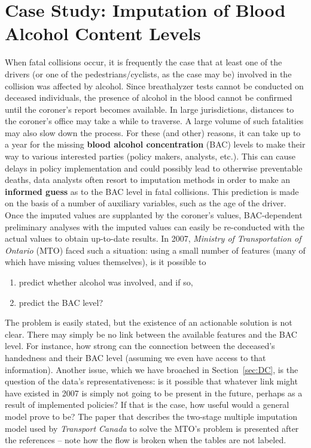 \section{Case Study: Imputation of Blood Alcohol Content Levels}
When fatal collisions occur, it is frequently the case that at least one of the drivers (or one of the pedestrians/cyclists, as the case may be) involved in the collision was affected by alcohol. Since breathalyzer tests cannot be conducted on deceased individuals, the presence of alcohol in the blood cannot be confirmed until the coroner's report becomes available. 
\newl In large jurisdictions, distances to the coroner's office may take a while to traverse. A large volume of such fatalities may also slow down the process. For these (and other) reasons, it can take up to a year for the missing \textbf{blood alcohol concentration} (BAC) levels to make their way to various interested parties (policy makers, analysts, etc.). This can cause delays in policy implementation and could possibly lead to otherwise preventable deaths, data analysts often resort to imputation methods in order to make an \textbf{informed guess} as to the BAC level in fatal collisions. This prediction is made on the basis of a number of auxiliary variables, such as the age of the driver. Once the imputed values are supplanted by the coroner's values, BAC-dependent preliminary analyses with the imputed values can easily be re-conducted with the actual values to obtain up-to-date results.
\newl In 2007, \textit{Ministry of Transportation of Ontario} (MTO) faced such a situation: using a small number of features (many of which have missing values themselves), is it possible to 
\begin{enumerate}[noitemsep]
    \item predict whether alcohol was involved, and if so, 
    \item predict the BAC level?
\end{enumerate}
The problem is easily stated, but the existence of an actionable solution is not clear. There may simply be no link between the available features and the BAC level. For instance, how strong can the connection between the deceased's handedness and their BAC level (assuming we even have access to that information). \newl Another issue, which we have broached in Section~\ref{sec:DC}, is the question of the data's representativeness: is it possible that whatever link might have existed in 2007 is simply not going to be present in the future, perhaps as a result of implemented policies? If that is the case, how useful would a general model prove to be? 
\newl The paper that describes the two-stage multiple imputation model used by \textit{Transport Canada} to solve the MTO's problem is presented after the references -- note how the flow is broken when the tables are not labeled. 



